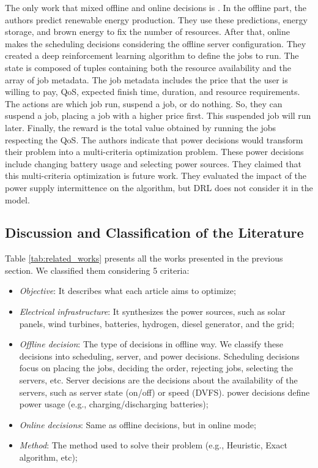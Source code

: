 The only work that mixed offline and online decisions is \cite{venkataswamy2023rare}. In the offline part, the authors predict renewable energy production. They use these predictions, energy storage, and brown energy to fix the number of resources. After that, online makes the scheduling decisions considering the offline server configuration. They created a deep reinforcement learning algorithm to define the jobs to run. The state is composed of tuples containing both the resource availability and the array of job metadata. The job metadata includes the price that the user is willing to pay, QoS, expected finish time, duration, and resource requirements. The actions are which job run, suspend a job, or do nothing. So, they can suspend a job, placing a job with a higher price first. This suspended job will run later. Finally, the reward is the total value obtained by running the jobs respecting the QoS. The authors indicate that power decisions would transform their problem into a multi-criteria optimization problem. These power decisions include changing battery usage and selecting power sources. They claimed that this multi-criteria optimization is future work. They evaluated the impact of the power supply intermittence on the algorithm, but DRL does not consider it in the model.

\subsection{Discussion and Classification of the Literature}
Table \ref{tab:related_works} presents all the works presented in the previous section. We classified them considering 5 criteria:

\begin{itemize}
    \item \textit{Objective}: It describes what each article aims to optimize;
    \item \textit{Electrical infrastructure}: It synthesizes the power sources, such as solar panels, wind turbines, batteries, hydrogen, diesel generator, and the grid;
    \item \textit{Offline decision}: The type of decisions in offline way. We classify these decisions into scheduling, server, and power decisions. Scheduling decisions focus on placing the jobs, deciding the order, rejecting jobs, selecting the servers, etc. Server decisions are the decisions about the availability of the servers, such as server state (on/off) or speed (DVFS). power decisions define power usage (e.g., charging/discharging batteries);
    \item \textit{Online decisions}: Same as offline decisions, but in online mode;
    \item \textit{Method}: The method used to solve their problem (e.g., Heuristic, Exact algorithm, etc);
\end{itemize}

